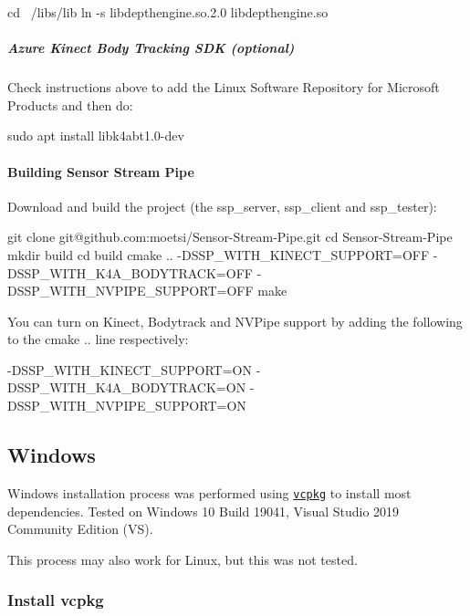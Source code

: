 \begin{DoxyCode}
cd ~/libs/lib
ln -s libdepthengine.so.2.0 libdepthengine.so
\end{DoxyCode}


\subparagraph*{Azure Kinect Body Tracking S\+DK (optional)}

Check instructions above to add the Linux Software Repository for Microsoft Products and then do\+:


\begin{DoxyCode}
sudo apt install libk4abt1.0-dev
\end{DoxyCode}


\paragraph*{Building Sensor Stream Pipe}

Download and build the project (the ssp\+\_\+server, ssp\+\_\+client and ssp\+\_\+tester)\+:


\begin{DoxyCode}
git clone git@github.com:moetsi/Sensor-Stream-Pipe.git
cd Sensor-Stream-Pipe
mkdir build
cd build
cmake .. -DSSP\_WITH\_KINECT\_SUPPORT=OFF -DSSP\_WITH\_K4A\_BODYTRACK=OFF -DSSP\_WITH\_NVPIPE\_SUPPORT=OFF
make
\end{DoxyCode}


You can turn on Kinect, Bodytrack and N\+V\+Pipe support by adding the following to the {\ttfamily cmake ..} line respectively\+:


\begin{DoxyCode}
-DSSP\_WITH\_KINECT\_SUPPORT=ON 
-DSSP\_WITH\_K4A\_BODYTRACK=ON
-DSSP\_WITH\_NVPIPE\_SUPPORT=ON
\end{DoxyCode}


\subsection*{Windows}

Windows installation process was performed using \href{https://docs.microsoft.com/en-us/cpp/build/vcpkg?view=msvc-160}{\tt vcpkg} to install most dependencies. Tested on Windows 10 Build 19041, Visual Studio 2019 Community Edition (VS).

This process may also work for Linux, but this was not tested.

\subsubsection*{Install vcpkg}

